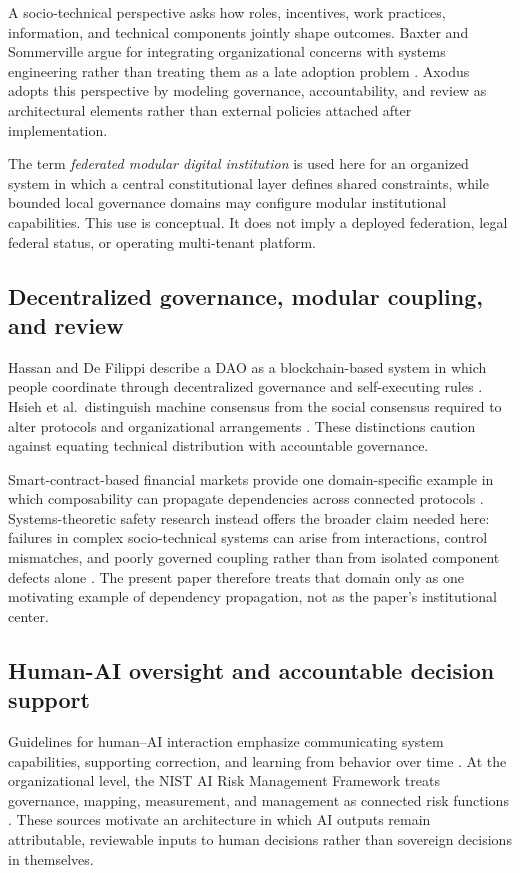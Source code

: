 \documentclass[11pt]{article}
\begin{document}
A socio-technical perspective asks how roles, incentives, work practices,
information, and technical components jointly shape outcomes. Baxter and
Sommerville argue for integrating organizational concerns with systems
engineering rather than treating them as a late adoption problem
\citep{baxter2011sociotechnical}. Axodus adopts this perspective by modeling
governance, accountability, and review as architectural elements rather than
external policies attached after implementation.

The term \emph{federated modular digital institution} is used here for an
organized system in which a central constitutional layer defines shared
constraints, while bounded local governance domains may configure modular
institutional capabilities. This use is conceptual. It does not imply a
deployed federation, legal federal status, or operating multi-tenant
platform.

\subsection{Decentralized governance, modular coupling, and review}

Hassan and De Filippi describe a DAO as a blockchain-based system in which
people coordinate through decentralized governance and self-executing rules
\citep{hassan2021dao}. Hsieh et al.\ distinguish machine consensus from the
social consensus required to alter protocols and organizational arrangements
\citep{hsieh2018bitcoin}. These distinctions caution against equating
technical distribution with accountable governance.

Smart-contract-based financial markets provide one domain-specific example in
which composability can propagate dependencies across connected protocols
\citep{schar2021defi}. Systems-theoretic safety research instead offers the
broader claim needed here: failures in complex socio-technical systems can
arise from interactions, control mismatches, and poorly governed coupling
rather than from isolated component defects alone
\citep{leveson2012engineering}. The present paper therefore treats that
domain only as one motivating example of dependency propagation, not as the
paper's institutional center.

\subsection{Human-AI oversight and accountable decision support}

Guidelines for human--AI interaction emphasize communicating system
capabilities, supporting correction, and learning from behavior over time
\citep{amershi2019guidelines}. At the organizational level, the NIST AI Risk
Management Framework treats governance, mapping, measurement, and management
as connected risk functions \citep{tabassi2023airmf}. These sources motivate
an architecture in which AI outputs remain attributable, reviewable inputs to
human decisions rather than sovereign decisions in themselves.
\end{document}
